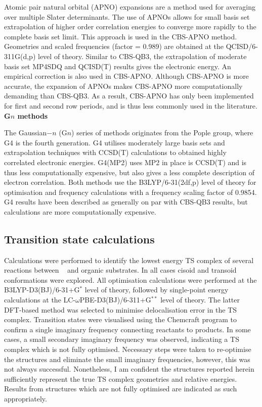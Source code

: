 Atomic pair natural orbital (APNO) expansions are a method used for averaging over multiple Slater determinants. The use of APNOs allows for small basis set extrapolation of higher order correlation energies to converge more rapidly to the complete basis set limit. This approach is used in the CBS-APNO method.\cite{Ochterski1996} Geometries and scaled frequencies (factor = 0.989) are obtained at the QCISD/6-311G(d,p) level of theory. Similar to CBS-QB3, the extrapolation of moderate basis set MP4SDQ and QCISD(T) results gives the electronic energy. An empirical correction is also used in CBS-APNO. Although CBS-APNO is more accurate, the expansion of APNOs makes CBS-APNO more computationally demanding than CBS-QB3. As a result, CBS-APNO has only been implemented for first and second row periods, and is thus less commonly used in the literature.
\\

\noindent \textbf{G$n$ methods}

The Gaussian$-n$ (G$n$) series of methods originates from the Pople group,\cite{Pople1989} where G4 is the fourth generation. G4 utilises moderately large basis sets and extrapolation techniques with CCSD(T) calculations to obtained highly correlated electronic energies. G4(MP2) uses MP2 in place is CCSD(T) and is thus less computationally expensive, but also gives a less complete description of electron correlation. Both methods use the B3LYP/6-31(2df,p) level of theory for optimisation and frequency calculations with a frequency scaling factor of 0.9854. G4 results have been described as generally on par with CBS-QB3 results,\cite{Somers2015, Simmie2015} but calculations are more computationally expensive.

\subsection{Transition state calculations}

Calculations were performed to identify the lowest energy TS complex of several reactions between \cumo~ and organic substrates. In all cases cisoid and transoid conformations were explored. All optimisation calculations were performed at the B3LYP-D3(BJ)/6-31+G$^*$ level of theory, followed by single-point energy calculations at the LC-$\omega$PBE-D3(BJ)/6-311+G$^{**}$ level of theory. The latter DFT-based method was selected to minimise delocalisation error in the TS complex.\cite{OterodelaRoza2014} Transition states were visualised using the Chemcraft program\cite{ccraft} to confirm a single imaginary frequency connecting reactants to products. In some cases, a small secondary imaginary frequency was observed, indicating a TS complex which is not fully optimised. Necessary steps were taken to re-optimise the structures and eliminate the small imaginary frequencies, however, this was not always successful. Nonetheless, I am confident the structures reported herein sufficiently represent the true TS complex geometries and relative energies. Results from structures which are not fully optimised are indicated as such appropriately.

